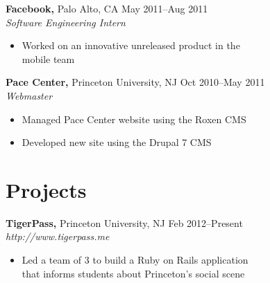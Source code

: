 \documentclass[margin]{res}
\begin{document}
\begin{resume}
 {\bf Facebook,} Palo Alto, CA \hfill May 2011--Aug 2011 \\
 {\it Software Engineering Intern}
 \begin{itemize} \itemsep -2pt  %
 \item Worked on an innovative unreleased product in the \\
   mobile team
 \end{itemize}

 {\bf Pace Center,} Princeton University, NJ \hfill Oct 2010--May 2011 \\
 {\it Webmaster}
 \begin{itemize} \itemsep -2pt  %
 \item Managed Pace Center website using the Roxen CMS
 \item Developed new site using the Drupal 7 CMS
 \end{itemize}



\section{Projects}
 {\bf TigerPass,} Princeton University, NJ \hfill Feb 2012--Present \\
 {\it http://www.tigerpass.me}
 \begin{itemize} \itemsep -2pt  %
 \item Led a team of 3 to build a Ruby on Rails application \\
   that informs students about Princeton's social scene
 \end{itemize}


\end{resume}
\end{document}
